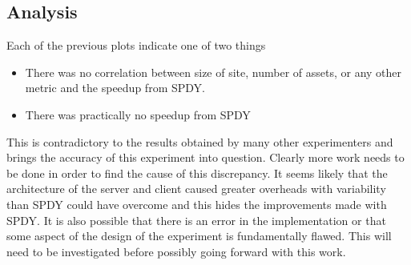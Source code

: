 \documentclass[10pt,letterpaper,notitlepage]{article}
\begin{document}
\subsection{Analysis}
\label{sec:realworld/analysis}
Each of the previous plots indicate one of two things
\begin{itemize}
    \item  There was no correlation between size of site, number of assets, or
        any other metric and the speedup from SPDY.
    \item There was practically no speedup from SPDY
\end{itemize}

This is contradictory to the results obtained by many other experimenters and
brings the accuracy of this experiment into question.  Clearly more work needs
to be done in order to find the cause of this discrepancy.  It seems likely that
the architecture of the server and client caused greater overheads with
variability than SPDY could have overcome and this hides the improvements made
with SPDY. It is also possible that there is an error in the implementation or
that some aspect of the design of the experiment is fundamentally flawed.  This
will need to be investigated before possibly going forward with this work.
%
\end{document}

